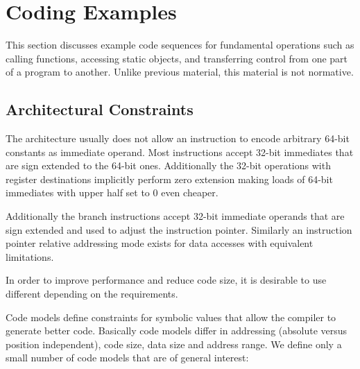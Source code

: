 \section{Coding Examples}
\label{sec_coding_examples}

This section discusses example code sequences for fundamental
operations such as calling functions, accessing static objects, and
transferring control from one part of a program to another.  Unlike
previous material, this material is not normative.

\subsection{Architectural Constraints}

The \xARCH architecture usually does not allow an instruction to encode
arbitrary
64-bit constants as immediate operand.  Most
instructions accept 32-bit immediates that are sign extended to the
64-bit ones.  Additionally the 32-bit operations with register
destinations implicitly perform zero extension making loads of 64-bit
immediates with upper half set to 0 even cheaper.

Additionally the branch instructions accept 32-bit immediate operands
that are sign extended and used to adjust the instruction pointer.
Similarly an instruction pointer relative addressing mode exists for
data accesses with equivalent limitations.

In order to improve performance and reduce code size, it is desirable
to use different  depending on the
requirements.

Code models define constraints for symbolic values that allow the
compiler to generate better code.  Basically code models differ in
addressing (absolute versus position independent), code size, data
size and address range.  We define only a small number of code models
that are of general interest:

